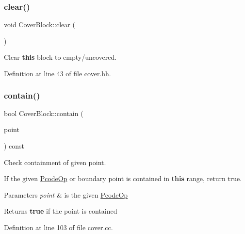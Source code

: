\subsubsection{\texorpdfstring{clear()}{clear()}}
{\footnotesize\ttfamily void Cover\+Block\+::clear (\begin{DoxyParamCaption}\item[{void}]{ }\end{DoxyParamCaption})\hspace{0.3cm}{\ttfamily [inline]}}



Clear {\bfseries{this}} block to empty/uncovered. 



Definition at line 43 of file cover.\+hh.

\mbox{\label{class_cover_block_abdea54abaa486a9cdfc03e083aaabb65}} 
\subsubsection{\texorpdfstring{contain()}{contain()}}
{\footnotesize\ttfamily bool Cover\+Block\+::contain (\begin{DoxyParamCaption}\item[{const \mbox{\hyperlink{class_pcode_op}{Pcode\+Op}} $\ast$}]{point }\end{DoxyParamCaption}) const}



Check containment of given point. 

If the given \mbox{\hyperlink{class_pcode_op}{Pcode\+Op}} or boundary point is contained in {\bfseries{this}} range, return true. 
\begin{DoxyParams}{Parameters}
{\em point} & is the given \mbox{\hyperlink{class_pcode_op}{Pcode\+Op}} \\
\hline
\end{DoxyParams}
\begin{DoxyReturn}{Returns}
{\bfseries{true}} if the point is contained 
\end{DoxyReturn}


Definition at line 103 of file cover.\+cc.

